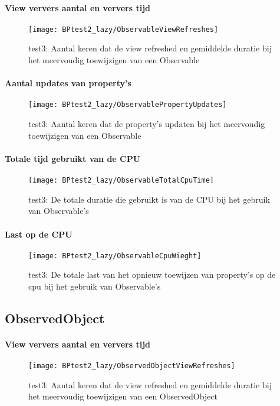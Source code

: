 \paragraph{View ververs aantal en ververs tijd}
\begin{figure}[H]
    \centering
    \texttt{[image: BPtest2\_lazy/ObservableViewRefreshes]} 
    \caption{test3: Aantal keren dat de view refreshed en gemiddelde duratie bij het meervoudig toewijzigen van een Observable}
    \label{fig:viewRefreshesObservable2}
\end{figure}
\paragraph{Aantal updates van property's}
\begin{figure}[H]
    \centering
    \texttt{[image: BPtest2\_lazy/ObservablePropertyUpdates]} 
    \caption{test3: Aantal keren dat de property's updaten bij het meervoudig toewijzigen van een Observable}
    \label{fig:propertyUpdatesObservable2}
\end{figure}
\paragraph{Totale tijd gebruikt van de CPU}
\begin{figure}[H]
    \centering
    \texttt{[image: BPtest2\_lazy/ObservableTotalCpuTime]} 
    \caption{test3: De totale duratie die gebruikt is van de CPU bij het gebruik van Observable's}
    \label{fig:cpuUsageTimeObservable2}
\end{figure}
\paragraph{Last op de CPU}
\begin{figure}[H]
    \centering
    \texttt{[image: BPtest2\_lazy/ObservableCpuWieght]} 
    \caption{test3: De totale last van het opnieuw toewijzen van property's op de cpu bij het gebruik van Observable's}
    \label{fig:cpuWeightObservable2}
\end{figure}

\subsection{ObservedObject}
\paragraph{View ververs aantal en ververs tijd}
\begin{figure}[H]
    \centering
    \texttt{[image: BPtest2\_lazy/ObservedObjectViewRefreshes]} 
    \caption{test3: Aantal keren dat de view refreshed en gemiddelde duratie bij het meervoudig toewijzigen van een ObservedObject}
    \label{fig:viewRefreshesObservedObject2}
\end{figure}
